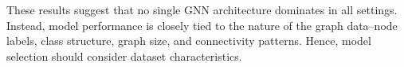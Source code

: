 \documentclass[11pt,a4paper]{article}
\begin{document}
	These results suggest that no single GNN architecture dominates in all settings. Instead, model performance is closely tied to the nature of the graph data--node labels, class structure, graph size, and connectivity patterns. Hence, model selection should consider dataset characteristics.
	
	\newpage
	
	
	
\end{document}
